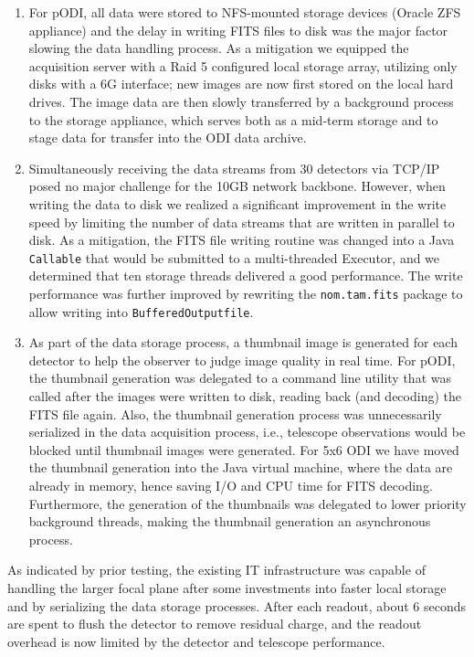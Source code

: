 \documentclass[]{spieman}
\begin{document}
\begin{enumerate} 
    
\item For pODI, all data were stored to NFS-mounted storage devices (Oracle ZFS
appliance) and the delay in  writing FITS files to disk was the major factor
slowing the data handling process. As a mitigation we equipped the acquisition
server with a Raid 5 configured local storage array, utilizing only disks with a
6G interface; new images are now first stored on the local hard drives. The
image data are then slowly transferred by a background process to the storage
appliance, which serves both as a mid-term storage and to stage data for
transfer into the ODI data archive.

\item   Simultaneously receiving the data streams from 30 detectors via
TCP/IP posed no major challenge for the 10GB network backbone.  However, when
writing the data to disk we realized a significant  improvement in the write
speed by limiting the number of data streams that are written in parallel to
disk. As a mitigation, the FITS file writing routine was changed into a Java
{\tt Callable} that would be submitted to a multi-threaded Executor, and we
determined that ten storage threads delivered a good performance. The write
performance was further improved by rewriting the {\tt nom.tam.fits} package to
allow writing into {\tt BufferedOutputfile}.

\item As part of the data storage process, a thumbnail image is generated for
each detector to help the observer to judge image quality in real time. For
pODI, the thumbnail generation was delegated to a command line utility that was
called after the images were written to disk, reading back (and decoding) the
FITS file again. Also, the thumbnail generation process was unnecessarily
serialized in the data acquisition process, i.e., telescope observations would
be blocked until thumbnail images were generated.  For 5x6 ODI we have moved the
thumbnail generation into the Java virtual machine, where the data are already in
memory, hence saving I/O and CPU time for FITS decoding. Furthermore, the
generation of the thumbnails was delegated to  lower priority background
threads, making the thumbnail generation an asynchronous process.

    
\end{enumerate}

As indicated by prior testing, the existing IT infrastructure was capable of
handling the larger focal plane after some investments into faster local storage
and by serializing the data storage  processes.  After each readout, about 6
seconds are spent to flush the detector to remove residual charge, and the
readout overhead is now limited by the detector and telescope performance.
\end{document}
